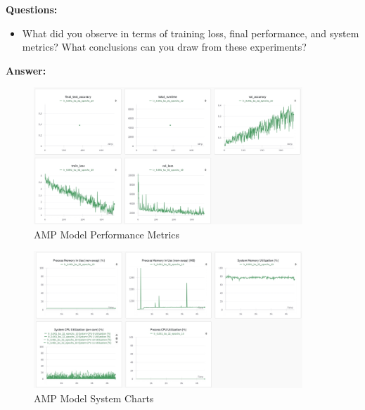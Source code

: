 \documentclass[11pt, oneside]{article}   	%
\begin{document}
\textbf{Questions:}
\begin{itemize}
    \item What did you observe in terms of training loss, final performance, and system metrics? What conclusions can you draw from these experiments?
\end{itemize}

\textbf{Answer:}
\\
\begin{figure}[h!]
    \centering
    \includegraphics[width=0.9\textwidth]{graphs/Figure_3.png}
    \caption{AMP Model Performance Metrics}
    \label{fig:amp_metrics}
\end{figure}

\begin{figure}[h!]
    \centering
    \includegraphics[width=0.9\textwidth]{graphs/Figure_4.png}
    \caption{AMP Model System Charts}
    \label{fig:amp_system}
\end{figure}
\end{document}
